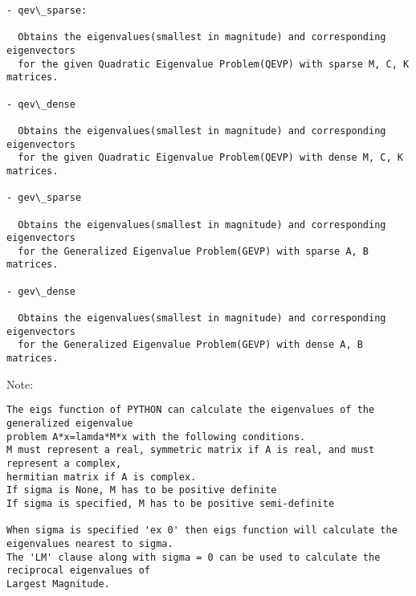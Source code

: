 \documentclass[letterpaper,10pt,english]{sphinxmanual}
\begin{document}
\begin{Verbatim}[commandchars=\\\{\}]
- qev\_sparse:

  Obtains the eigenvalues(smallest in magnitude) and corresponding eigenvectors 
  for the given Quadratic Eigenvalue Problem(QEVP) with sparse M, C, K matrices.
 
- qev\_dense

  Obtains the eigenvalues(smallest in magnitude) and corresponding eigenvectors 
  for the given Quadratic Eigenvalue Problem(QEVP) with dense M, C, K matrices.
    
- gev\_sparse

  Obtains the eigenvalues(smallest in magnitude) and corresponding eigenvectors 
  for the Generalized Eigenvalue Problem(GEVP) with sparse A, B matrices. 
  
- gev\_dense

  Obtains the eigenvalues(smallest in magnitude) and corresponding eigenvectors 
  for the Generalized Eigenvalue Problem(GEVP) with dense A, B matrices.
\end{Verbatim}

Note:

\begin{Verbatim}[commandchars=\\\{\}]
The eigs function of PYTHON can calculate the eigenvalues of the generalized eigenvalue
problem A*x=lamda*M*x with the following conditions.
M must represent a real, symmetric matrix if A is real, and must represent a complex, 
hermitian matrix if A is complex.
If sigma is None, M has to be positive definite 
If sigma is specified, M has to be positive semi-definite

When sigma is specified 'ex 0' then eigs function will calculate the eigenvalues nearest to sigma. 
The 'LM' clause along with sigma = 0 can be used to calculate the reciprocal eigenvalues of 
Largest Magnitude.
\end{Verbatim}
\end{document}
